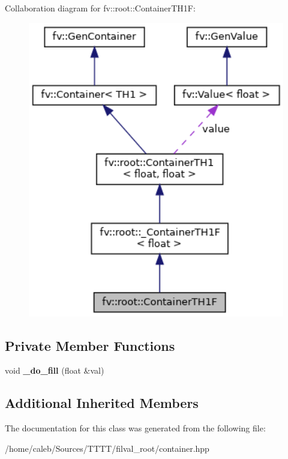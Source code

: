 Collaboration diagram for fv\+:\+:root\+:\+:Container\+T\+H1F\+:
\nopagebreak
\begin{figure}[H]
\begin{center}
\leavevmode
\includegraphics[width=322pt]{classfv_1_1root_1_1ContainerTH1F__coll__graph}
\end{center}
\end{figure}
\subsection*{Private Member Functions}
\begin{DoxyCompactItemize}
\item 
\hypertarget{classfv_1_1root_1_1ContainerTH1F_ae76e459ed2d830d22756064145f840c4}{}\label{classfv_1_1root_1_1ContainerTH1F_ae76e459ed2d830d22756064145f840c4} 
void {\bfseries \+\_\+do\+\_\+fill} (float \&val)
\end{DoxyCompactItemize}
\subsection*{Additional Inherited Members}


The documentation for this class was generated from the following file\+:\begin{DoxyCompactItemize}
\item 
/home/caleb/\+Sources/\+T\+T\+T\+T/filval\+\_\+root/container.\+hpp\end{DoxyCompactItemize}
